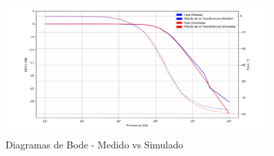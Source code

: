 \documentclass[11pt, a4paper]{article}
\begin{document}
\begin{figure}[H]
	\centering
	\includegraphics[width=0.9\textwidth]{Bode_filtro_pasabajo.png}
	\caption{Diagramas de Bode - Medido vs Simulado} 
	\label{graf:bodes_pasabajo}
\end{figure}

\end{document}
